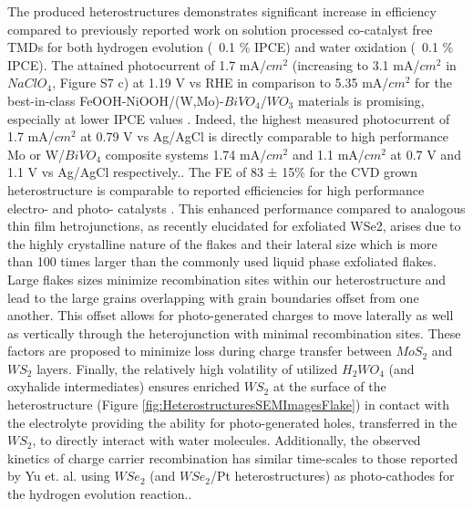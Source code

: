 The produced heterostructures demonstrates significant increase in efficiency compared to previously reported work on solution processed co-catalyst free TMDs for both hydrogen evolution (~0.1 \% IPCE) and water oxidation (~0.1 \% IPCE)\cite{Yu2015}\cite{Fu2015}. The attained photocurrent of 1.7 mA/$cm^2$ (increasing to 3.1 mA/$cm^2$ in $NaClO_4$, Figure S7 c) at 1.19 V vs RHE  in comparison to 5.35 mA/$cm^2$ for the best-in-class FeOOH-NiOOH/(W,Mo)-$BiVO_4$/$WO_3$ materials is promising, especially at lower IPCE values \cite{Shi2014a}. Indeed, the highest measured photocurrent of 1.7 mA/$cm^2$ at 0.79 V vs Ag/AgCl is directly comparable to high performance Mo or W/$BiVO_4$ composite systems 1.74 mA/$cm^2$ and 1.1 mA/$cm^2$ at 0.7 V and 1.1 V vs Ag/AgCl respectively.\cite{Hong2011}\cite{Pilli2011}. The FE of 83 ± 15\% for the CVD grown heterostructure is comparable to reported efficiencies for high performance electro- and photo- catalysts \cite{McCrory2015}.
This enhanced performance compared to analogous thin film hetrojunctions, \cite{Fu2015} as recently elucidated for exfoliated WSe2,\cite{Yu2017}\cite{Yu2017a} arises due to the highly crystalline nature of the flakes and their lateral size which is more than 100 times larger than the commonly used liquid phase exfoliated flakes. Large flakes sizes minimize recombination sites within our heterostructure and lead to the large grains overlapping with grain boundaries offset from one another. This offset allows for photo-generated charges to move laterally as well as vertically through the heterojunction with minimal recombination sites. These factors are proposed to minimize loss during charge transfer between $MoS_2$ and $WS_2$ layers. Finally, the relatively high volatility of utilized $H_2WO_4$ (and oxyhalide intermediates) ensures enriched $WS_2$ at the surface of the heterostructure (Figure \ref{fig:HeterostructuresSEMImagesFlake}) in contact with the electrolyte providing the ability for photo-generated holes, transferred in the $WS_2$, to directly interact with water molecules. Additionally, the observed kinetics of charge carrier recombination has similar time-scales to those reported by Yu et. al. using $WSe_2$ (and $WSe_2$/Pt heterostructures) as photo-cathodes for the hydrogen evolution reaction.\cite{Yu2015}\cite{Yu2017}\cite{Yu2016}.

